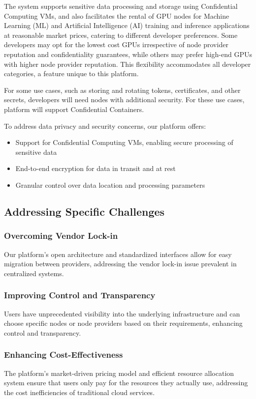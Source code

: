 The system supports sensitive data processing and storage using Confidential Computing VMs, and also facilitates the rental of GPU nodes for Machine Learning (ML) and Artificial Intelligence (AI) training and inference applications at reasonable market prices, catering to different developer preferences. Some developers may opt for the lowest cost GPUs irrespective of node provider reputation and confidentiality guarantees, while others may prefer high-end GPUs with higher node provider reputation. This flexibility accommodates all developer categories, a feature unique to this platform.

For some use cases, such as storing and rotating tokens, certificates, and other secrets, developers will need nodes with additional security. For these use cases, platform will support Confidential Containers\cite{brasser2022trusted}.

To address data privacy and security concerns, our platform offers:
\begin{itemize}
    \item Support for Confidential Computing VMs, enabling secure processing of sensitive data
    \item End-to-end encryption for data in transit and at rest
    \item Granular control over data location and processing parameters
\end{itemize}

\subsection{Addressing Specific Challenges}

\subsubsection{Overcoming Vendor Lock-in}
Our platform's open architecture and standardized interfaces allow for easy migration between providers, addressing the vendor lock-in issue prevalent in centralized systems.

\subsubsection{Improving Control and Transparency}
Users have unprecedented visibility into the underlying infrastructure and can choose specific nodes or node providers based on their requirements, enhancing control and transparency.

\subsubsection{Enhancing Cost-Effectiveness}
The platform's market-driven pricing model and efficient resource allocation system ensure that users only pay for the resources they actually use, addressing the cost inefficiencies of traditional cloud services.

